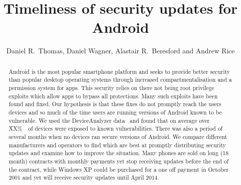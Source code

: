 \documentclass[conference,a4paper,twoside]{IEEEtran}
\author{Daniel R.\ Thomas, Daniel Wagner, Alastair R.\ Beresford and Andrew Rice}
\newcommand{\percInsec}{XX\%~\cite{TODO}}
\begin{document}
\title{Timeliness of security updates for Android}


\author{
}


\maketitle


\begin{abstract}
Android is the most popular smartphone platform and seeks to provide better security than popular desktop operating systems through increased compartmentalisation and a permission system for apps.
This security relies on there not being root privilege exploits which allow apps to bypass all protections.
Many such exploits have been found and fixed.
Our hypothesis is that these fixes do not promptly reach the users devices and so much of the time users are running versions of Android known to be vulnerable.
We used the DeviceAnalyzer data~\cite{Wagner2013} and found that on average over \percInsec\ of devices were exposed to known vulnerabilities.
There was also a period of several months when no devices ran secure versions of Android.
We compare different manufacturers and operators to find which are best at promptly distributing security updates and examine how to improve the situation.
Many phones are sold on long (18 month) contracts with monthly payments yet stop receiving updates before the end of the contract, while Windows XP could be purchased for a one off payment in October 2001 and yet will receive security updates until April 2014.
\end{abstract}
\end{document}
